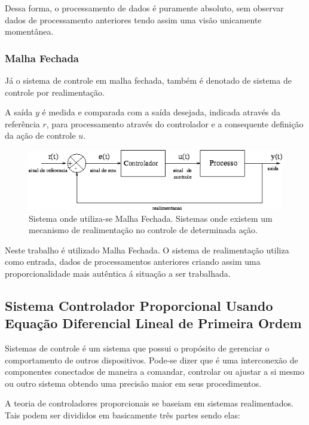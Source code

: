 \documentclass[portugues, brazil, a4paper,12pt]{article}
\begin{document}
			Dessa forma, o processamento de dados é puramente absoluto, sem observar dados de processamento anteriores tendo assim uma visão unicamente momentânea.


		\subsubsection{Malha Fechada}
			Já o sistema de controle em malha fechada, também é denotado de sistema de  controle  por  realimentação.

			A  saída $ y $ é  medida e comparada com   a   saída   desejada,   indicada   através   da referência $ r $,   para processamento  através  do  controlador  e  a  consequente  definição  da  ação  de controle $ u $.

			\begin{figure}[H]
				\centering
				\includegraphics[width=\linewidth]{img/rf-malha_fechada.png}
				\caption{Sistema onde utiliza-se Malha Fechada. Sistemas onde existem um mecanismo de realimentação no controle de determinada ação.}
				\label{fig:malha_fechada}
			\end{figure}

			Neste trabalho é utilizado Malha Fechada. O sistema de realimentação utiliza como entrada, dados de processamentos anteriores criando assim uma proporcionalidade mais autêntica á situação a ser trabalhada.


	\subsection{Sistema Controlador Proporcional Usando Equação Diferencial Lineal de Primeira Ordem} \label{sec:eql1}
		Sistemas de controle é um sistema que possui o propósito de gerenciar o comportamento de outros dispositivos. Pode-se dizer que é uma interconexão de componentes conectados de maneira a comandar, controlar ou ajustar a si mesmo ou outro sistema obtendo uma precisão maior em seus procedimentos.

		A teoria de controladores proporcionais se baseiam em sistemas realimentados. Tais podem ser divididos em basicamente três partes sendo elas:
\end{document}
